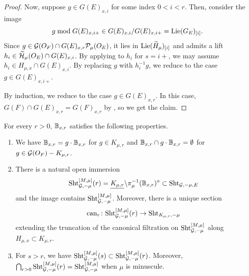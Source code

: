 \documentclass[12pt,reqno]{amsart}
\begin{document}
\begin{proof}
    Now, suppose $g \in G(E)_{x, i}$ for some index $0 < i < r$. Then, consider the image 
    \[
        g \bmod G(E)_{x, i+} \in G(E)_{x, i} / G(E)_{x, i+} = {\operatorname{Lie}}(G_E)_{[i]}. 
    \]
    Since $g \in {\mathcal{G}}(O_F) \cap G(E)_{x, r} {\mathcal{P}}_{\mu}(O_E)$, it lies in ${\operatorname{Lie}}({\widetilde{H}}_\mu)_{[i]}$ and admits a lift $h_i \in {\widetilde{{\mathcal{H}}}}_\mu(O_E) \cap G(E)_{x, i}$. By applying  to $h_i$ for $s = i+$, we may assume $h_i \in H_{\mu, x} \cap G(E)_{x, i}$. By replacing $g$ with $h_i^{-1}g$, we reduce to the case $g \in G(E)_{x, i+}$. 

    By induction, we reduce to the case $g \in G(E)_{x, r}$. In this case, $G(F) \cap G(E)_{x, r} = G(F)_{x, r}$ by \cite[Proposition 12.9.4]{KP23}, so we get the claim. 
\end{proof}

\begin{thm} \label{thm:canonical_level_structures}
    For every $r > 0$, $\mathbb{B}_{x, r}$ satisfies the following properties. 
    \begin{enumerate}
        \item We have $\mathbb{B}_{x, r} = g \cdot \mathbb{B}_{x, r}$ for $g \in K_{\mu, r}$ and $\mathbb{B}_{x, r} \cap g \cdot \mathbb{B}_{x, r} = \emptyset$ for $g \in {\mathcal{G}}(O_F) - K_{\mu, r}$. 
        \item There is a natural open immersion 
        \[
            {\operatorname{Sht}}_{{\mathcal{G}}, -\mu}^{[M, \mu]}(r) = {\underline{K_{\mu, r}}} \backslash \pi_\mu^{-1}(\mathbb{B}_{x, r})^\diamond \subset {\operatorname{Sht}}_{{\mathcal{G}}, -\mu, E}
        \]
        and the image contains ${\operatorname{Sht}}_{{\mathcal{G}}, -\mu}^{[M, \mu]}$. Moreover, there is a unique section
        \[
            {\operatorname{can}}_r \colon {\operatorname{Sht}}_{{\mathcal{G}}, -\mu}^{[M, \mu]}(r) \to {\operatorname{Sht}}_{K_{\mu, r}, -\mu}
        \]
        extending the truncation of the canonical filtration on ${\operatorname{Sht}}_{{\mathcal{G}}, -\mu}^{[M, \mu]}$ along $H_{\mu, x} \subset K_{\mu ,r}$. 
        \item For $s> r $, we have ${\operatorname{Sht}}_{{\mathcal{G}}, -\mu}^{[M, \mu]}(s) \subset {\operatorname{Sht}}_{{\mathcal{G}}, -\mu}^{[M, \mu]}(r)$. Moreover, $\bigcap_{r>0} {\operatorname{Sht}}_{{\mathcal{G}}, -\mu}^{[M, \mu]}(r) = {\operatorname{Sht}}_{{\mathcal{G}}, -\mu}^{[M, \mu]}$ when $\mu$ is minuscule. 
    \end{enumerate}
\end{thm}
\end{document}
